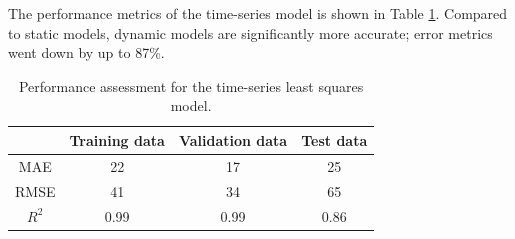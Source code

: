 The performance metrics of the time-series model is shown in Table \ref{tab:08ts_performance}.  Compared to static models, dynamic models are significantly more accurate; error metrics went down by up to 87\%.
\begin{table}[h]
    \centering
    {
    \begin{tabular}{ c | c | c | c}
                             &  Training data    &  Validation data   &    Test data      \\
        \hline
        MAE                  &      22           &        17          &   25    \\
        RMSE                 &      41           &        34          &   65    \\ 
        $R^2$                &      0.99         &        0.99        &   0.86  \\
    \end{tabular}}
    \caption{Performance assessment for the time-series least squares model.}
    \label{tab:08ts_performance}
\end{table}

